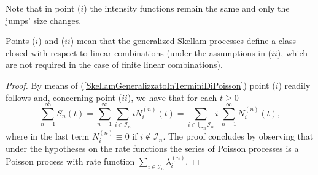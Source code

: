 \documentclass[12pt, twoside, english, headsepline]{article}
\theoremstyle{definition} %
\numberwithin{equation}{section} %
\begin{document}
Note that in point ($i$) the intensity functions remain the same and only the jumps' size changes. 

Points ($i$) and ($ii$) mean that the generalized Skellam processes define a class closed  with respect to linear combinations (under the assumptions in ($ii$), which are not required in the case of finite linear combinations). 

\begin{proof}  %
By means of (\ref{SkellamGeneralizzatoInTerminiDiPoisson}) point ($i$) readily follows and, concerning point ($ii$), we have that for each $t\ge0$
\begin{equation}
\sum_{n=1}^\infty S_n(t) = \sum_{n=1}^\infty \sum_{i\in\mathcal{I}_n} i N_i^{(n)}(t) = \sum_{i\in\bigcup_n\mathcal{I}_n} i\ \sum_{n=1}^\infty N_i^{(n)}(t),
\end{equation}
where in the last term $N_i^{(n)} \equiv 0$ if $i\not\in\mathcal{I}_n$. The proof concludes by observing that under the hypotheses on the rate functions the series of Poisson processes is a Poisson process with rate function $\sum_{i\in\mathcal{I}_n} \lambda_i^{(n)}$.
\end{proof}
\end{document}
